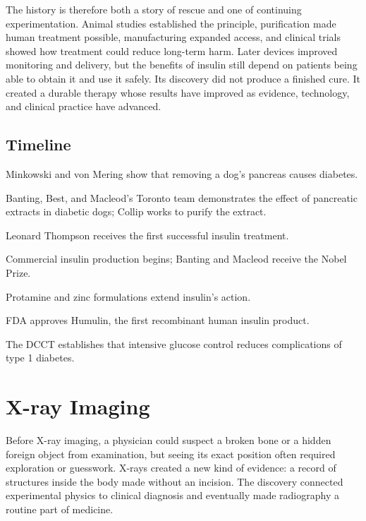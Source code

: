 \documentclass[12pt,oneside]{book}
\begin{document}
The history is therefore both a story of rescue and one of continuing
experimentation. Animal studies established the principle, purification made
human treatment possible, manufacturing expanded access, and clinical trials
showed how treatment could reduce long-term harm. Later devices improved
monitoring and delivery, but the benefits of insulin still depend on patients
being able to obtain it and use it safely. Its discovery did not produce a
finished cure. It created a durable therapy whose results have improved as
evidence, technology, and clinical practice have advanced.

\section*{Timeline}
\begin{description}[leftmargin=2.3cm,style=nextline]
  \item[1889] Minkowski and von Mering show that removing a dog's pancreas causes diabetes.
  \item[1921] Banting, Best, and Macleod's Toronto team demonstrates the effect of pancreatic extracts in diabetic dogs; Collip works to purify the extract.
  \item[January 1922] Leonard Thompson receives the first successful insulin treatment.
  \item[1923] Commercial insulin production begins; Banting and Macleod receive the Nobel Prize.
  \item[1930s] Protamine and zinc formulations extend insulin's action.
  \item[1982] FDA approves Humulin, the first recombinant human insulin product.
  \item[1983--1993] The DCCT establishes that intensive glucose control reduces complications of type 1 diabetes.
\end{description}
\chapter[X-ray Imaging]{X-ray Imaging}

Before X-ray imaging, a physician could suspect a broken bone or a hidden
foreign object from examination, but seeing its exact position often
required exploration or guesswork. X-rays created a new kind of evidence: a
record of structures inside the body made without an incision. The discovery
connected experimental physics to clinical diagnosis and eventually made
radiography a routine part of medicine.
\end{document}
